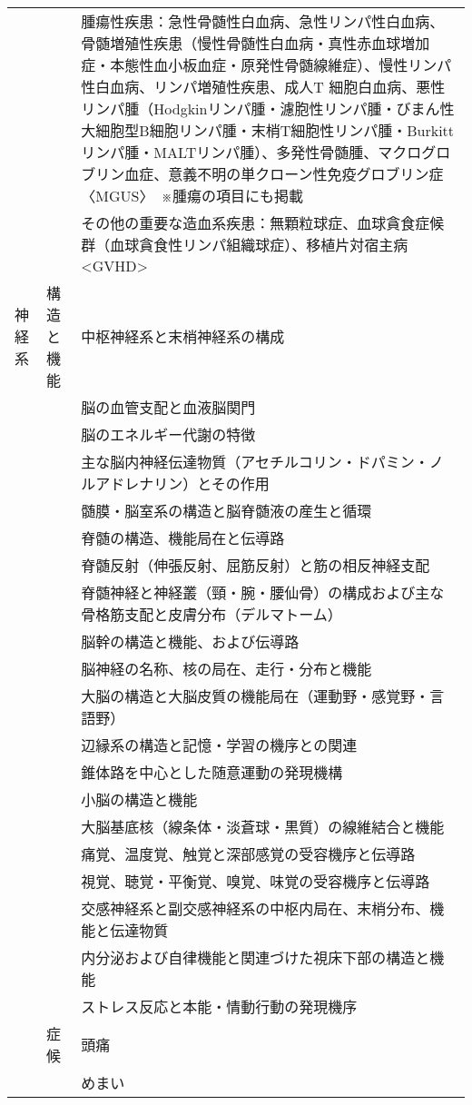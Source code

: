 \begin{xltabular}{\linewidth}{XXX}
 &  & 腫瘍性疾患：急性骨髄性白血病、急性リンパ性白血病、骨髄増殖性疾患（慢性骨髄性白血病・真性赤血球増加症・本態性血小板血症・原発性骨髄線維症）、慢性リンパ性白血病、リンパ増殖性疾患、成人T 細胞白血病、悪性リンパ腫（Hodgkinリンパ腫・濾胞性リンパ腫・びまん性大細胞型B細胞リンパ腫・末梢T細胞性リンパ腫・Burkittリンパ腫・MALTリンパ腫）、多発性骨髄腫、マクログロブリン血症、意義不明の単クローン性免疫グロブリン症〈MGUS〉　※腫瘍の項目にも掲載 \\
 &  & その他の重要な造血系疾患：無顆粒球症、血球貪食症候群（血球貪食性リンパ組織球症）、移植片対宿主病<GVHD> \\
神経系 & 構造と機能 & 中枢神経系と末梢神経系の構成 \\
 &  & 脳の血管支配と血液脳関門 \\
 &  & 脳のエネルギー代謝の特徴 \\
 &  & 主な脳内神経伝達物質（アセチルコリン・ドパミン・ノルアドレナリン）とその作用 \\
 &  & 髄膜・脳室系の構造と脳脊髄液の産生と循環 \\
 &  & 脊髄の構造、機能局在と伝導路 \\
 &  & 脊髄反射（伸張反射、屈筋反射）と筋の相反神経支配 \\
 &  & 脊髄神経と神経叢（頸・腕・腰仙骨）の構成および主な骨格筋支配と皮膚分布（デルマトーム） \\
 &  & 脳幹の構造と機能、および伝導路 \\
 &  & 脳神経の名称、核の局在、走行・分布と機能 \\
 &  & 大脳の構造と大脳皮質の機能局在（運動野・感覚野・言語野） \\
 &  & 辺縁系の構造と記憶・学習の機序との関連 \\
 &  & 錐体路を中心とした随意運動の発現機構 \\
 &  & 小脳の構造と機能 \\
 &  & 大脳基底核（線条体・淡蒼球・黒質）の線維結合と機能 \\
 &  & 痛覚、温度覚、触覚と深部感覚の受容機序と伝導路 \\
 &  & 視覚、聴覚・平衡覚、嗅覚、味覚の受容機序と伝導路 \\
 &  & 交感神経系と副交感神経系の中枢内局在、末梢分布、機能と伝達物質 \\
 &  & 内分泌および自律機能と関連づけた視床下部の構造と機能 \\
 &  & ストレス反応と本能・情動行動の発現機序 \\
 & 症候 & 頭痛 \\
 &  & めまい \\

\end{xltabular}
